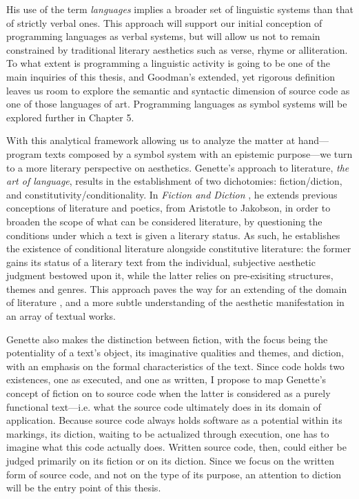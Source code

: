 His use of the term \emph{languages} implies a broader set of linguistic systems than that of strictly verbal ones. This approach will support our initial conception of programming languages as verbal systems, but will allow us not to remain constrained by traditional literary aesthetics such as verse, rhyme or alliteration. To what extent is programming a linguistic activity is going to be one of the main inquiries of this thesis, and Goodman's extended, yet rigorous definition leaves us room to explore the semantic and syntactic dimension of source code as one of those languages of art. Programming languages as symbol systems will be explored further in Chapter 5.

With this analytical framework allowing us to analyze the matter at hand—program texts composed by a symbol system with an epistemic purpose—we turn to a more literary perspective on aesthetics. Genette's approach to literature, \emph{the art of language}, results in the establishment of two dichotomies: fiction/diction, and constitutivity/conditionality. In \emph{Fiction and Diction} \citep{genette_fiction_1993}, he extends previous conceptions of literature and poetics, from Aristotle to Jakobson, in order to broaden the scope of what can be considered literature, by questioning the conditions under which a text is given a literary status. As such, he establishes the existence of conditional literature alongside constitutive literature: the former gains its status of a literary text from the individual, subjective aesthetic judgment bestowed upon it, while the latter relies on pre-exisiting structures, themes and genres. This approach paves the way for an extending of the domain of literature \citep{gefen_extension_2019}, and a more subtle understanding of the aesthetic manifestation in an array of textual works.

Genette also makes the distinction between fiction, with the focus being the potentiality of a text's object, its imaginative qualities and themes, and diction, with an emphasis on the formal characteristics of the text. Since code holds two existences, one as executed, and one as written, I propose to map Genette's concept of fiction on to source code when the latter is considered as a purely functional text—i.e. what the source code ultimately does in its domain of application. Because source code always holds software as a potential within its markings, its diction, waiting to be actualized through execution, one has to imagine what this code actually does. Written source code, then, could either be judged primarily on its fiction or on its diction. Since we focus on the written form of source code, and not on the type of its purpose, an attention to diction will be the entry point of this thesis.

